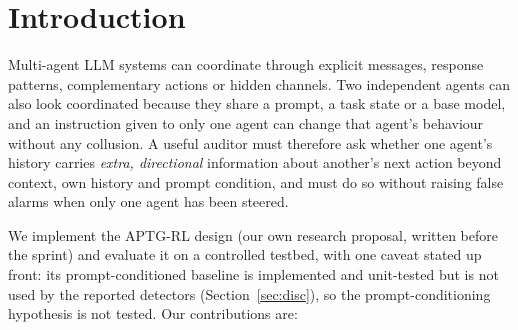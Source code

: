 \documentclass[11pt]{article}
\begin{document}
\section{Introduction}
Multi-agent LLM systems can coordinate through explicit messages, response patterns, complementary actions or hidden channels. Two independent agents can also look coordinated because they share a prompt, a task state or a base model, and an instruction given to only one agent can change that agent's behaviour without any collusion. A useful auditor must therefore ask whether one agent's history carries \emph{extra, directional} information about another's next action beyond context, own history and prompt condition, and must do so without raising false alarms when only one agent has been steered.

We implement the APTG-RL design (our own research proposal, written before the sprint) and evaluate it on a controlled testbed, with one caveat stated up front: its prompt-conditioned baseline is implemented and unit-tested but is not used by the reported detectors (Section~\ref{sec:disc}), so the prompt-conditioning hypothesis is not tested. Our contributions are:
\end{document}
